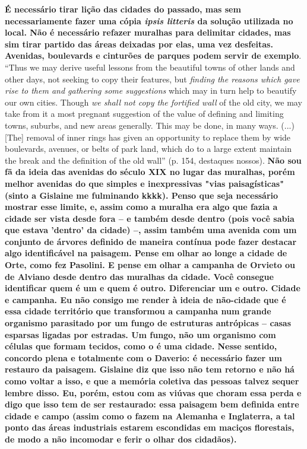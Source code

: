 \documentclass[12pt, a4paper]{book} %
\begin{document}
        \textbf{É necessário tirar lição das cidades do passado, mas sem necessariamente fazer uma cópia \textit{ipsis litteris} da solução utilizada no local. Não é necessário refazer muralhas para delimitar cidades, mas sim tirar partido das áreas deixadas por elas, uma vez desfeitas. Avenidas, boulevards e cinturões de parques podem servir de exemplo}. ``Thus we may derive useful lessons from the beautiful towns of other lands and other days, not seeking to copy their features, but \textit{finding the reasons which gave rise to them and gathering some suggestions} which may in turn help to beautify our own cities. Though \textit{we shall not copy the fortified wall} of the old city, we may take from it a most pregnant suggestion of the value of defining and limiting towns, suburbs, and new areas generally. This may be done, in many ways. (...) [The] removal of inner rings has given an opportunity to replace them by wide boulevards, avenues, or belts of park land, which do to a large extent maintain the break and the definition of the old wall'' (p. 154, destaques nossos).
        \textbf{Não sou fã da ideia das avenidas do século XIX no lugar das muralhas, porém melhor avenidas do que simples e inexpressivas "vias paisagísticas" (sinto a Gislaine me fulminando kkkk). Penso que seja necessário mostrar esse limite, e, assim como a muralha era algo que fazia a cidade ser vista desde fora – e também desde dentro (pois você sabia que estava 'dentro' da cidade) –, assim também uma avenida com um conjunto de árvores definido de maneira contínua pode fazer destacar algo identificável na paisagem. Pense em olhar ao longe a cidade de Orte, como fez Pasolini. E pense em olhar a campanha de Orvieto ou de Alviano desde dentro das muralhas da cidade. Você consegue identificar quem é um e quem é outro. Diferenciar um e outro. Cidade e campanha. Eu não consigo me render à ideia de não-cidade que é essa cidade território que transformou a campanha num grande organismo parasitado por um fungo de estruturas antrópicas – casas esparsas ligadas por estradas. Um fungo, não um organismo com células que formam tecidos, como o é uma cidade. Nesse sentido, concordo plena e totalmente com o Daverio: é necessário fazer um restauro da paisagem. Gislaine diz que isso não tem retorno e não há como voltar a isso, e que a memória coletiva das pessoas talvez sequer lembre disso. Eu, porém, estou com as viúvas que choram essa perda e digo que isso tem de ser restaurado: essa paisagem bem definida entre cidade e campo (assim como o fazem na Alemanha e Inglaterra, a tal ponto das áreas industriais estarem escondidas em maciços florestais, de modo a não incomodar e ferir o olhar dos cidadãos).}
\end{document}
